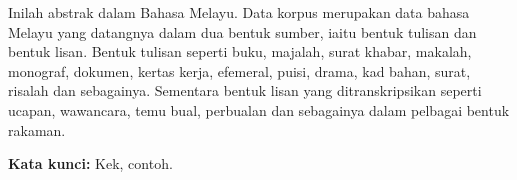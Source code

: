 \begin{abstrak}
Inilah abstrak dalam Bahasa Melayu. Data korpus merupakan data bahasa
Melayu yang datangnya dalam dua bentuk sumber, iaitu bentuk tulisan
dan bentuk lisan. Bentuk tulisan seperti buku, majalah, surat khabar,
makalah, monograf, dokumen, kertas kerja, efemeral, puisi, drama,
kad bahan, surat, risalah dan sebagainya. Sementara bentuk lisan yang
ditranskripsikan seperti ucapan, wawancara, temu bual, perbualan dan
sebagainya dalam pelbagai bentuk rakaman.

\textbf{Kata kunci:} Kek, contoh.
\end{abstrak}

